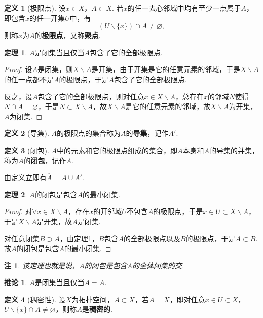 \documentclass[12pt]{ctexart}
\theoremstyle{definition}
\newtheorem{definition}{定义}
\newtheorem{theorem}{定理}
\newtheorem{corollary}{推论}
\theoremstyle{plain}
\newtheorem*{remark}{注}
\begin{document}
	\begin{definition}[极限点]
		设$x\in X$，$A\subset X$. 若$x$的任一去心邻域中均有至少一点属于$A$，即包含$x$的任一开集$U$中，有
		$$\left(U\backslash\{x\}\right)\cap A\neq\varnothing,$$
		则称$x$为$A$的\textbf{极限点}，又称\textbf{聚点}.
	\end{definition}
	\begin{theorem}\label{closeeq}
		$A$是闭集当且仅当$A$包含了它的全部极限点.
	\end{theorem}
	\begin{proof}
		设$A$是闭集，则$X\backslash A$是开集，由于开集是它的任意元素的邻域，于是$X\backslash A$的任一点都不是$A$的极限点，于是$A$包含了它的全部极限点.
		
		反之，设$A$包含了它的全部极限点，则对任意$x\in X\backslash A$，总存在$x$的邻域$N$使得$N\cap A=\varnothing$，于是$N\subset X\backslash A$，故$X\backslash A$是它的任意元素的邻域，故$X\backslash A$为开集，$A$为闭集.
	\end{proof}
	\begin{definition}[导集]
		$A$的极限点的集合称为$A$的\textbf{导集}，记作$A'$.
	\end{definition}
	\begin{definition}[闭包]
		$A$中的元素和它的极限点组成的集合，即$A$本身和$A$的导集的并集，称为$A$的\textbf{闭包}，记作$\overline{A}$.
	\end{definition}
	由定义立即有$\overline{A}=A\cup A'$.
	\begin{theorem}
		$A$的闭包是包含$A$的最小闭集.
	\end{theorem}
	\begin{proof}
		对$\forall x\in X\backslash \overline{A}$，存在$x$的开邻域$U$不包含$A$的极限点，于是$x\in U\subset X\backslash \overline{A}$，于是$X\backslash\overline{A}$是开集，故$\overline{A}$是闭集. 
		
		对任意闭集$B\supset A$，由定理\ref{closeeq}，$B$包含$A$的全部极限点以及$B$的极限点，于是$\overline{A}\subset B$. 故$A$的闭包是包含$A$的最小闭集.
	\end{proof}
	\begin{remark}
		该定理也就是说，$A$的闭包是包含$A$的全体闭集的交.
	\end{remark}
	\begin{corollary}
		$A$是闭集当且仅当$A=\overline{A}$.
	\end{corollary}
	\begin{definition}[稠密性]
		设$X$为拓扑空间，$A\subset X$，若$\overline{A}=X$，即对任意$x\in U\subset X$，$U\backslash\{x\}\cap A\neq\varnothing$，则称$A$是\textbf{稠密的}.
	\end{definition}
\end{document}
